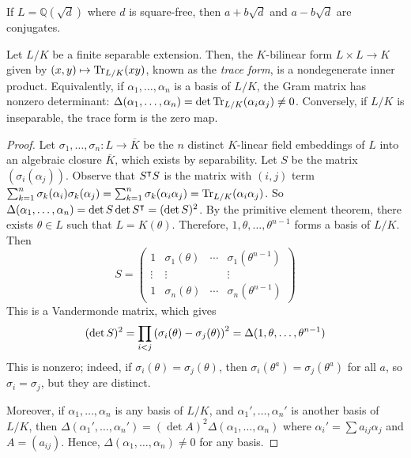 \begin{example}
    If \( L = \mathbb Q(\sqrt d) \) where \( d \) is square-free, then \( a + b\sqrt d \) and \( a - b\sqrt d \) are conjugates.
\end{example}
\begin{proposition}
    Let \( L / K \) be a finite separable extension.
    Then, the \( K \)-bilinear form \( L \times L \to K \) given by \( (x, y) \mapsto \Tr_{L/K}(xy) \), known as the \emph{trace form}, is a nondegenerate inner product.
    Equivalently, if \( \alpha_1, \dots, \alpha_n \) is a basis of \( L / K \), the Gram matrix has nonzero determinant: \( \Delta(\alpha_1, \dots, \alpha_n) = \det \Tr_{L/K}(\alpha_i \alpha_j) \neq 0 \).
    Conversely, if \( L / K \) is inseparable, the trace form is the zero map.
\end{proposition}
\begin{proof}
    Let \( \sigma_1, \dots, \sigma_n \colon L \to \overline K \) be the \( n \) distinct \( K \)-linear field embeddings of \( L \) into an algebraic closure \( \overline K \), which exists by separability.
    Let \( S \) be the matrix \( (\sigma_i(\alpha_j)) \).
    Observe that \( S^\intercal S \) is the matrix with \( (i,j) \) term \( \sum_{k=1}^n \sigma_k(\alpha_i) \sigma_k(\alpha_j) = \sum_{k=1}^n \sigma_k(\alpha_i \alpha_j) = \Tr_{L/K}(\alpha_i \alpha_j) \).
    So \( \Delta(\alpha_1, \dots, \alpha_n) = \det S \det S^\intercal = (\det S)^2 \).
    By the primitive element theorem, there exists \( \theta \in L \) such that \( L = K(\theta) \).
    Therefore, \( 1, \theta, \dots, \theta^{n-1} \) forms a basis of \( L / K \).
    Then
    \[ S = \begin{pmatrix}
        1 & \sigma_1(\theta) & \cdots & \sigma_1(\theta^{n-1}) \\
        \vdots & \vdots & & \vdots \\
        1 & \sigma_n(\theta) & \cdots & \sigma_n(\theta^{n-1})
    \end{pmatrix} \]
    This is a Vandermonde matrix, which gives
    \[ (\det S)^2 = \prod_{i < j} \qty(\sigma_i(\theta) - \sigma_j(\theta))^2 = \Delta(1, \theta, \dots, \theta^{n-1}) \]
    This is nonzero; indeed, if \( \sigma_i(\theta) = \sigma_j(\theta) \), then \( \sigma_i(\theta^a) = \sigma_j(\theta^a) \) for all \( a \), so \( \sigma_i = \sigma_j \), but they are distinct.

    Moreover, if \( \alpha_1, \dots, \alpha_n \) is any basis of \( L / K \), and \( \alpha_1', \dots, \alpha_n' \) is another basis of \( L / K \), then \( \Delta(\alpha_1', \dots, \alpha_n') = (\det A)^2 \Delta(\alpha_1, \dots, \alpha_n) \) where \( \alpha_i' = \sum a_{ij} \alpha_j \) and \( A = (a_{ij}) \).
    Hence, \( \Delta(\alpha_1, \dots, \alpha_n) \neq 0 \) for any basis.
\end{proof}
